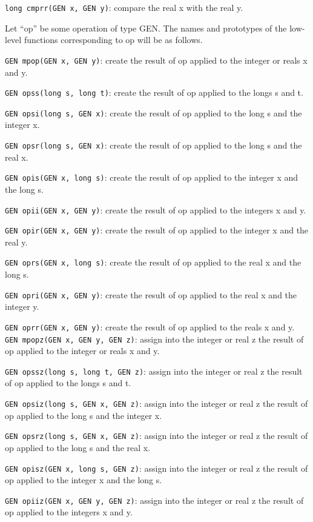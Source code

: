 {\tt long cmprr(GEN x, GEN y)}: compare the real x with the real y.


Let ``op'' be some operation of type GEN. The names and prototypes of the 
low-level functions corresponding to op will be as follows.

{\tt GEN mpop(GEN x, GEN y)}: create the result of op applied to the integer
or reals x and y.

{\tt GEN opss(long s, long t)}: create the result of op applied to the longs
s and t.

{\tt GEN opsi(long s, GEN x)}: create the result of op applied to the long s
and the integer x.

{\tt GEN opsr(long s, GEN x)}: create the result of op applied to the long s
and the real x.

{\tt GEN opis(GEN x, long s)}: create the result of op applied to the integer x
and the long s.

{\tt GEN opii(GEN x, GEN y)}: create the result of op applied to the integers x
and y.

{\tt GEN opir(GEN x, GEN y)}: create the result of op applied to the integer x
and the real y.

{\tt GEN oprs(GEN x, long s)}: create the result of op applied to the real x
and the long s.

{\tt GEN opri(GEN x, GEN y)}: create the result of op applied to the real x
and the integer y.

{\tt GEN oprr(GEN x, GEN y)}: create the result of op applied to the reals x
and y.
\smallskip
{\tt GEN mpopz(GEN x, GEN y, GEN z)}: assign into the integer or real z
the result of op applied to the integer or reals x and y.

{\tt GEN opssz(long s, long t, GEN z)}: assign into the integer or real z
the result of op applied to the longs s and t.

{\tt GEN opsiz(long s, GEN x, GEN z)}: assign into the integer or real z
the result of op applied to the long s and the integer x.

{\tt GEN opsrz(long s, GEN x, GEN z)}: assign into the integer or real z
the result of op applied to the long s and the real x.

{\tt GEN opisz(GEN x, long s, GEN z)}: assign into the integer or real z
the result of op applied to the integer x and the long s.

{\tt GEN opiiz(GEN x, GEN y, GEN z)}: assign into the integer or real z
the result of op applied to the integers x and y.

